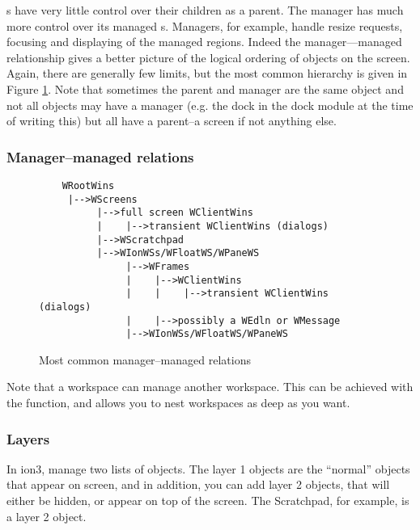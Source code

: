s have very little control over their children as a parent.
The manager  has much more control over its
managed s. Managers, for example, handle resize requests,
focusing and displaying of the managed regions. Indeed the manager---managed
relationship gives a better picture of the logical ordering of objects on
the screen. Again, there are generally few limits, but the most common
hierarchy is given in Figure \ref{fig:managership}. Note that sometimes
the parent and manager are the same object and not all objects may have
a manager (e.g. the dock in the dock module at the time of writing this)
but all have a parent--a screen if not anything else.

\subsubsection{Manager--managed relations}

\begin{figure}
\begin{htmlonly}
\docode %
\end{htmlonly}
\begin{verbatim}
    WRootWins
     |-->WScreens
          |-->full screen WClientWins
          |    |-->transient WClientWins (dialogs)
          |-->WScratchpad
          |-->WIonWSs/WFloatWS/WPaneWS
               |-->WFrames
               |    |-->WClientWins
               |    |    |-->transient WClientWins (dialogs)
               |    |-->possibly a WEdln or WMessage
               |-->WIonWSs/WFloatWS/WPaneWS
\end{verbatim}
\caption{Most common manager--managed relations}
\label{fig:managership}
\end{figure}

Note that a workspace can manage another workspace. This can be
achieved with the  function, and allows you to nest
workspaces as deep as you want.

\subsubsection{Layers}

In ion3,  manage two lists of objects. The layer 1
objects are the ``normal'' objects that appear on screen, and in
addition, you can add layer 2 objects, that will either be hidden, or
appear on top of the screen. The Scratchpad, for example, is a layer 2
object.

